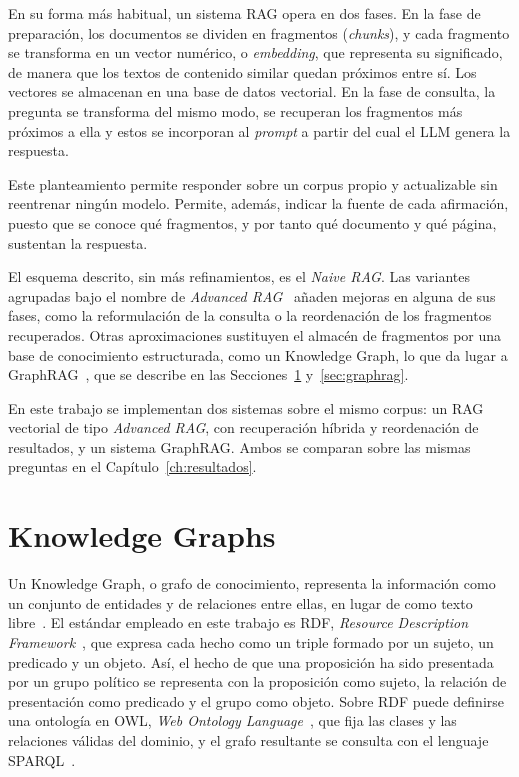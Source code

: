 \documentclass[11pt, a4paper]{report}
\begin{document}
	En su forma más habitual, un sistema RAG opera en dos fases. En la fase de
	preparación, los documentos se dividen en fragmentos (\textit{chunks}), y cada fragmento se transforma en un vector numérico, o
	\textit{embedding}, que representa su significado, de manera que los textos de
	contenido similar quedan próximos entre sí. Los vectores se almacenan en una
	base de datos vectorial. En la fase de consulta, la pregunta se transforma del
	mismo modo, se recuperan los fragmentos más próximos a ella y estos se
	incorporan al \textit{prompt} a partir del cual el LLM genera la respuesta.

	Este planteamiento permite responder sobre un corpus propio y actualizable sin
	reentrenar ningún modelo. Permite, además, indicar la fuente de cada
	afirmación, puesto que se conoce qué fragmentos, y por tanto qué documento y
	qué página, sustentan la respuesta.

	El esquema descrito, sin más refinamientos, es el \textit{Naive RAG}. Las variantes agrupadas bajo el nombre de \textit{Advanced
	RAG}~\cite{gao2023-rag-survey} añaden mejoras en alguna de sus fases, como la
	reformulación de la consulta o la reordenación de los fragmentos recuperados.
	Otras aproximaciones sustituyen el almacén de fragmentos por una base de
	conocimiento estructurada, como un Knowledge Graph, lo que da lugar a
	GraphRAG~\cite{edge2024-graphrag}, que se describe en las
	Secciones~\ref{sec:grafos} y~\ref{sec:graphrag}.

	En este trabajo se implementan dos sistemas sobre el mismo corpus: un RAG
	vectorial de tipo \textit{Advanced RAG}, con recuperación híbrida y
	reordenación de resultados, y un sistema GraphRAG. Ambos se comparan sobre las
	mismas preguntas en el Capítulo~\ref{ch:resultados}.

	\section{Knowledge Graphs}
	\label{sec:grafos}

	Un Knowledge Graph, o grafo de conocimiento, representa la información como un
	conjunto de
	entidades y de relaciones entre ellas, en lugar de como texto
	libre~\cite{hogan2021-knowledge-graphs}. El estándar empleado en este trabajo
	es RDF, \textit{Resource Description Framework}~\cite{w3c-rdf11}, que expresa
	cada hecho como un triple formado por un sujeto, un predicado y un objeto.
	Así, el hecho de que una proposición ha sido presentada por un grupo político
	se representa con la proposición como sujeto, la relación de presentación como
	predicado y el grupo como objeto. Sobre RDF puede definirse una ontología en
	OWL, \textit{Web Ontology Language}~\cite{w3c-owl2}, que fija las clases y las
	relaciones válidas del dominio, y el grafo resultante se consulta con el
	lenguaje SPARQL~\cite{w3c-sparql11}.
\end{document}
